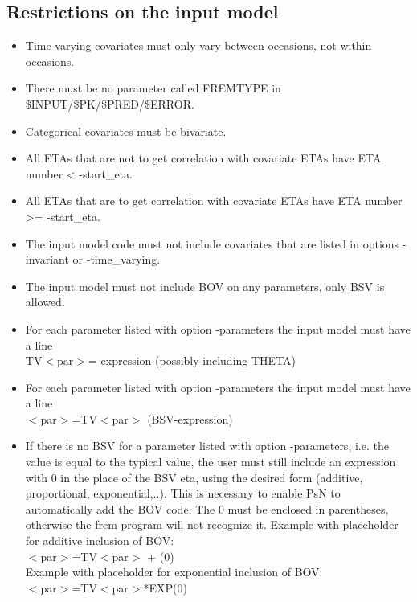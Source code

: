 \subsection{Restrictions on the input model}
\begin{itemize}
	\item Time-varying covariates must only vary between occasions, not within occasions. 
	\item There must be no parameter called FREMTYPE in \$INPUT/\$PK/\$PRED/\$ERROR.
	\item Categorical covariates must be bivariate.
    \item All ETAs that are not to get correlation with covariate ETAs have ETA number < -start\_eta.
    \item All ETAs that are to get correlation with covariate ETAs have ETA number >= -start\_eta.
    \item The input model code must not include covariates that are listed in 
    options -invariant or -time\_varying.
    \item The input model must not include BOV on any parameters, only BSV is allowed.
    \item For each parameter listed with option -parameters the input model must have a line \\
    TV$<$par$>$= expression (possibly including THETA)
    \item For each parameter listed with option -parameters the input model must have a line \\
    $<$par$>$=TV$<$par$>$ (BSV-expression)
    \item If there is no BSV for a parameter listed with option -parameters, 
    i.e. the value is equal to the typical value, the user must still 
    include an expression with 0 in the place of the BSV eta, using the desired form (additive, proportional, exponential,..). 
    This is necessary to enable PsN to automatically add the BOV code. The 0 must be enclosed in parentheses, otherwise the 
    frem program will not recognize it. Example with placeholder for additive inclusion of BOV:\\
    $<$par$>$=TV$<$par$>$ + (0) \\
    Example with placeholder for exponential inclusion of BOV:\\
    $<$par$>$=TV$<$par$>$*EXP(0) 
\end{itemize}


